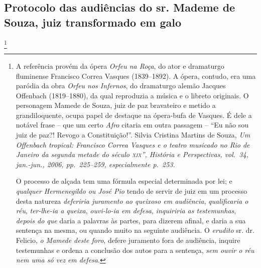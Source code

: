 \subsection{Protocolo das audiências do sr. Mademe de Souza, juiz transformado em
galo}\footnote{ A referência provém da ópera \emph{Orfeu na Roça}, do
  ator e dramaturgo fluminense Francisco Correa Vasques (1839--1892). A
  ópera, contudo, era uma paródia da obra \emph{Orfeu nos Infernos}, do
  dramaturgo alemão Jacques Offenbach (1819--1880), da qual reproduzia a
  música e o libreto originais. O personagem Mamede de Souza, juiz de
  paz bravateiro e metido a grandiloquente, ocupa papel de destaque na
  ópera-bufa de Vasques. É dele a notável frase -- que um certo
  \emph{Afro} citaria em outra passagem -- ``Eu não sou juiz de paz?!
  Revogo a Constituição!''. Silvia Cristina Martins de Souza, \emph{Um
  Offenbach tropical: Francisco Correa Vasques e o teatro musicado no
  Rio de Janeiro da segunda metade do século \textsc{xix}'', História e
  Perspectivas, vol.~34, jan.-jun., 2006, pp.~225--259, especialmente
  p.~253.}

O processo de alçada tem uma fórmula especial determinada por lei; e
\emph{qualquer Hermenegildo ou José Pio} tendo de servir de juiz em um
processo desta natureza \emph{deferiria juramento ao queixoso em
audiência}, \emph{qualificaria o réu}, \emph{ter-lhe-ia a queixa},
\emph{ouvi-lo-ia em defesa}, \emph{inquiriria as testemunhas},
\emph{depois do que} daria a palavras às partes, para dizerem afinal, e
daria a sua sentença na mesma, ou quando muito na seguinte audiência. O
\emph{erudito} sr. dr. Felicio, \emph{o Mamede deste foro}, defere
juramento fora de audiência, inquire testemunhas e ordena a conclusão
dos autos para a sentença, \emph{sem ouvir o réu} \emph{nem uma só vez}
\emph{em defesa}.

}
